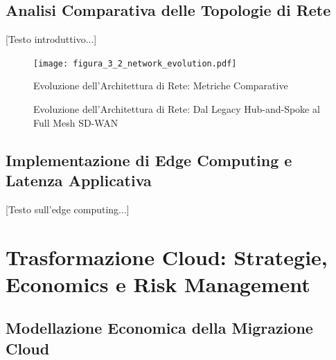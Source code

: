 \subsection{Analisi Comparativa delle Topologie di Rete}

[Testo introduttivo...]

\begin{figure}[htbp]
\centering
\texttt{[image: figura\_3\_2\_network\_evolution.pdf]}
\caption{Evoluzione dell'Architettura di Rete: Metriche Comparative}
\label{fig:network_evolution_metrics}
\end{figure}

\begin{figure}[htbp]
\centering
{}
\caption{Evoluzione dell'Architettura di Rete: Dal Legacy Hub-and-Spoke al Full Mesh SD-WAN}
\label{fig:network_evolution_arch}
\end{figure}

\subsection{Implementazione di Edge Computing e Latenza Applicativa}

[Testo sull'edge computing...]

\section{Trasformazione Cloud: Strategie, Economics e Risk Management}

\subsection{Modellazione Economica della Migrazione Cloud}

